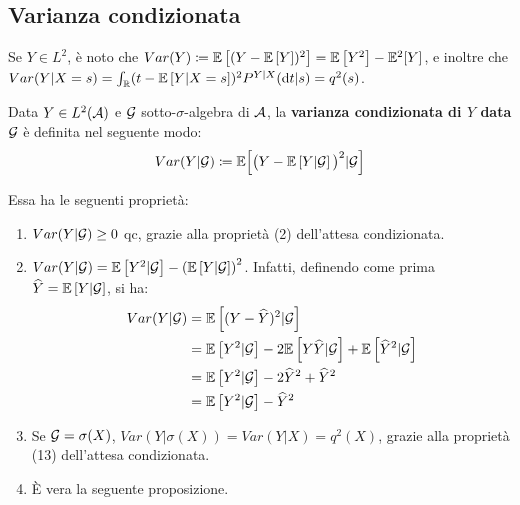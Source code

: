 \subsection{Varianza condizionata}
Se $Y \in L^2$, è noto che $Var(Y) \coloneqq \mathbb E \left[ (Y-\mathbb E \left[ Y \right])^2 \right] = \mathbb E \left[ Y^2 \right] - \mathbb E^2[Y]$, e inoltre che $Var(Y|X=s) = \int_\mathbb R (t-\mathbb E \left[ Y|X=s \right])^2 P^{Y|X}(\mathrm d t|s) = q^2(s)$.
\begin{defn}
  Data $Y \in L^2(\mathcal A)$ e $\mathcal G$ sotto-$\sigma$-algebra di $\mathcal A$, la \textbf{varianza condizionata di $Y$ data $\mathcal G$} è definita nel seguente modo:
  $$Var(Y|\mathcal G) \coloneqq \mathbb E \Big[ \big(Y-\mathbb E \left[ Y|\mathcal G \right]\big)^2 | \mathcal G \Big]$$
\end{defn}
Essa ha le seguenti proprietà:
\begin{enumerate}
  \item $Var(Y|\mathcal G) \geq 0$ qc, grazie alla proprietà (2) dell'attesa condizionata.
  \item $Var(Y|\mathcal G) = \mathbb E \left[ Y^2|\mathcal G \right] - \left(\mathbb E\left[ Y|\mathcal G \right]\right)^2 $. Infatti, definendo come prima $\widehat Y = \mathbb E \left[ Y|\mathcal G \right]$, si ha:
  \begin{align*}
    Var(Y|\mathcal G) &= \mathbb E \left[ (Y-\widehat Y)^2 | \mathcal G \right]\\
    &= \mathbb E \left[ Y^2|\mathcal G \right] - 2\mathbb E \left[ Y\widehat Y|\mathcal G \right] + \mathbb E \left[ \widehat Y^2 | \mathcal G \right]\\
    &= \mathbb E \left[ Y^2|\mathcal G \right] - 2\widehat Y^2 + \widehat Y^2 \\
    &= \mathbb E \left[ Y^2|\mathcal G \right]-\widehat Y^2
  \end{align*}
  \item Se $\mathcal G = \sigma(X)$, $Var(Y|\sigma(X)) = Var(Y|X) = q^2(X)$, grazie alla proprietà (13) dell'attesa condizionata.
  \item È vera la seguente proposizione.
\end{enumerate}

